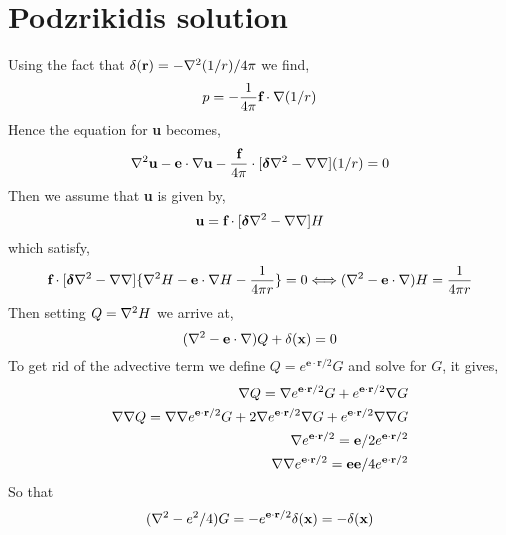 \section{Podzrikidis solution}
Using the fact that $\delta(\textbf{r}) = -  \mathbf{\nabla}^2(1/r) / 4\pi$ we find,
\begin{equation}
     p = - \frac{1}{4\pi}\textbf{f} \cdot \mathbf{\nabla} (1/r)
\end{equation}
Hence the equation for \textbf{u} becomes,
\begin{equation}
    \mathbf{\nabla}^2 \textbf{u}
    - \textbf{e}\cdot \mathbf{\nabla} \textbf{u}
    - \frac{\textbf{f}}{4\pi}\cdot [\bm\delta\mathbf{\nabla}^2  -  \mathbf{\nabla}\mathbf{\nabla}] (1/r)
    = 0
\end{equation}
Then we assume that \textbf{u} is given by,
\begin{equation}
    \textbf{u} = \textbf{f}\cdot [\bm\delta\mathbf{\nabla}^2  -  \mathbf{\nabla}\mathbf{\nabla}] H
\end{equation}
which satisfy,
\begin{equation}
    \textbf{f}\cdot [\bm\delta\mathbf{\nabla}^2  -  \mathbf{\nabla}\mathbf{\nabla}]\{
        \mathbf{\nabla}^2 H
        - \textbf{e}\cdot \mathbf{\nabla} H
        - \frac{1}{4\pi r }
        \}
    = 0
    \Longleftrightarrow
        (\mathbf{\nabla}^2
        - \textbf{e}\cdot \mathbf{\nabla}) H
        =
         \frac{1}{4\pi r }
\end{equation}
Then setting $Q = \mathbf{\nabla}^2 H$ we arrive at,
\begin{equation}
        (\mathbf{\nabla}^2 - \textbf{e}\cdot \mathbf{\nabla}) Q
        + \delta(\textbf{x})
    = 0
\end{equation}
To get rid of the advective term we define $Q = e^{\textbf{e}\cdot \textbf{r}/2} G$ and solve for $G$, it gives,
 \begin{align}
    \mathbf{\nabla}  Q
    = \mathbf{\nabla} e^{\textbf{e}\cdot \textbf{r}/2} G+ e^{\textbf{e}\cdot \textbf{r}/2} \mathbf{\nabla} G\\
    \mathbf{\nabla}\mathbf{\nabla}  Q
    =
    \mathbf{\nabla} \mathbf{\nabla} e^{\textbf{e}\cdot \textbf{r}/2} G
    +2  \mathbf{\nabla} e^{\textbf{e}\cdot \textbf{r}/2} \mathbf{\nabla} G
    +e^{\textbf{e}\cdot \textbf{r}/2} \mathbf{\nabla}\mathbf{\nabla}  G\\
    \mathbf{\nabla} e^{\textbf{e}\cdot \textbf{r}/2}
    =
    \textbf{e}/2 e^{\textbf{e}\cdot \textbf{r}/2} \\
    \mathbf{\nabla}\mathbf{\nabla} e^{\textbf{e}\cdot \textbf{r}/2}
    =
    \textbf{ee}/4  e^{\textbf{e}\cdot \textbf{r}/2}
 \end{align}
 So that
 \begin{equation}
    (\mathbf{\nabla}^2  -e^2/4    )G
    =
    - e^{\textbf{e}\cdot \textbf{r}/2} \delta(\textbf{x})
    =
    -  \delta(\textbf{x})
\end{equation}

